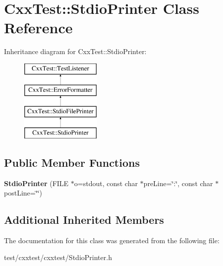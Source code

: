 \hypertarget{classCxxTest_1_1StdioPrinter}{\section{Cxx\-Test\-:\-:Stdio\-Printer Class Reference}
\label{classCxxTest_1_1StdioPrinter}
}
Inheritance diagram for Cxx\-Test\-:\-:Stdio\-Printer\-:\begin{figure}[H]
\begin{center}
\leavevmode
\includegraphics[height=4.000000cm]{classCxxTest_1_1StdioPrinter}
\end{center}
\end{figure}
\subsection*{Public Member Functions}
\begin{DoxyCompactItemize}
\item 
\hypertarget{classCxxTest_1_1StdioPrinter_a81a3fc2eb69b66d022cfb96801b1ba36}{{\bfseries Stdio\-Printer} (F\-I\-L\-E $\ast$o=stdout, const char $\ast$pre\-Line=\char`\"{}\-:\char`\"{}, const char $\ast$post\-Line=\char`\"{}\char`\"{})}\label{classCxxTest_1_1StdioPrinter_a81a3fc2eb69b66d022cfb96801b1ba36}

\end{DoxyCompactItemize}
\subsection*{Additional Inherited Members}


The documentation for this class was generated from the following file\-:\begin{DoxyCompactItemize}
\item 
test/cxxtest/cxxtest/Stdio\-Printer.\-h\end{DoxyCompactItemize}
